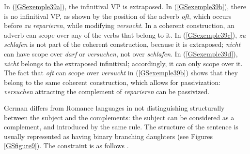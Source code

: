 \documentclass[output=paper
                ,modfonts
                ,nonflat
	        ,collection
	        ,collectionchapter
	        ,collectiontoclongg
 	        ,biblatex
                ,babelshorthands
                ,newtxmath
                ,draftmode
                ,colorlinks, citecolor=brown
]{./langsci/langscibook}
\begin{document}
{\eal
	\label{GSexemple39} 
	\label{GSexemple39a}

	\label{GSexemple39b}

	\label{GSexemple39c}	
		
	\label{GSexemple39d}
\zl

In (\ref{GSexemple39a}), the infinitival VP is extraposed. In (\ref{GSexemple39b}), there is no infinitival VP, as shown by the position of the adverb \emph{oft}, which occurs before \emph{zu reparieren}, while modifying \emph{versucht}. In a coherent construction, an adverb can scope over any of the verbs that belong to it. In (\ref{GSexemple39c}), \emph{zu schlafen} is not part of the coherent construction, because it is extraposed; \emph{nicht} can have scope over \emph{darf} or \emph{versuchen}, not over \emph{schlafen}. In (\ref{GSexemple39d}), \emph{nicht} belongs to the extraposed infinitival; accordingly, it can only scope over it. The fact that \emph{oft} can scope over \emph{versucht} in (\ref{GSexemple39b}) shows that they belong to the same coherent construction, which allows for passivization: \emph{versuchen} attracting the complement of \emph{reparieren} can be passivized.

German differs from Romance languages in not distinguishing structurally between the subject and the complements: the subject can be considered as a complement, and introduced by the same rule. The structure of the sentence is usually represented as having binary branching daughters (see Figures \ref{GSfigure9}). The constraint is as follows \citep{muller2018clause}.

}
\end{document}
